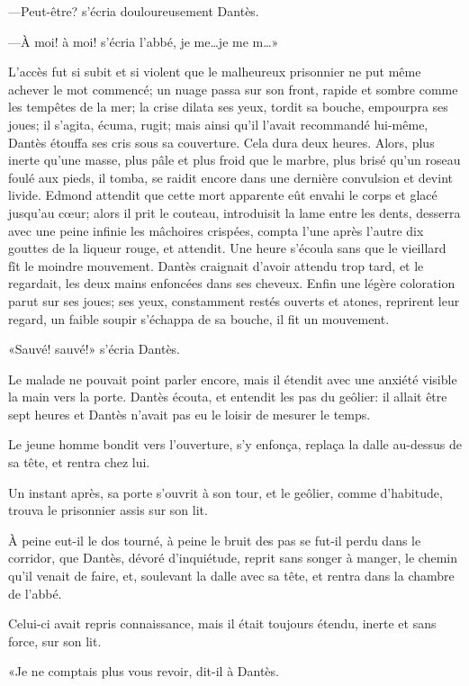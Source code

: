 —Peut-être? s'écria douloureusement Dantès.

—À moi! à moi! s'écria l'abbé, je me\dots je me m\dots»

L'accès fut si subit et si violent que le malheureux prisonnier ne put même achever le mot commencé; un nuage passa sur son front, rapide et sombre comme les tempêtes de la mer; la crise dilata ses yeux, tordit sa bouche, empourpra ses joues; il s'agita, écuma, rugit; mais ainsi qu'il l'avait recommandé lui-même, Dantès étouffa ses cris sous sa couverture. Cela dura deux heures. Alors, plus inerte qu'une masse, plus pâle et plus froid que le marbre, plus brisé qu'un roseau foulé aux pieds, il tomba, se raidit encore dans une dernière convulsion et devint livide. Edmond attendit que cette mort apparente eût envahi le corps et glacé jusqu'au cœur; alors il prit le couteau, introduisit la lame entre les dents, desserra avec une peine infinie les mâchoires crispées, compta l'une après l'autre dix gouttes de la liqueur rouge, et attendit. Une heure s'écoula sans que le vieillard fît le moindre mouvement. Dantès craignait d'avoir attendu trop tard, et le regardait, les deux mains enfoncées dans ses cheveux. Enfin une légère coloration parut sur ses joues; ses yeux, constamment restés ouverts et atones, reprirent leur regard, un faible soupir s'échappa de sa bouche, il fit un mouvement.

«Sauvé! sauvé!» s'écria Dantès.

Le malade ne pouvait point parler encore, mais il étendit avec une anxiété visible la main vers la porte. Dantès écouta, et entendit les pas du geôlier: il allait être sept heures et Dantès n'avait pas eu le loisir de mesurer le temps.

Le jeune homme bondit vers l'ouverture, s'y enfonça, replaça la dalle au-dessus de sa tête, et rentra chez lui.

Un instant après, sa porte s'ouvrit à son tour, et le geôlier, comme d'habitude, trouva le prisonnier assis sur son lit.

À peine eut-il le dos tourné, à peine le bruit des pas se fut-il perdu dans le corridor, que Dantès, dévoré d'inquiétude, reprit sans songer à manger, le chemin qu'il venait de faire, et, soulevant la dalle avec sa tête, et rentra dans la chambre de l'abbé.

Celui-ci avait repris connaissance, mais il était toujours étendu, inerte et sans force, sur son lit.

«Je ne comptais plus vous revoir, dit-il à Dantès.

